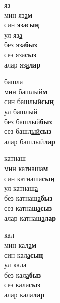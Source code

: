 \begin{multicols}{4}
\begin{enumerate}
\begin{minipage}{\linewidth}
    \item
    яз\\
    мин яз\underline{а}\textbf{м}\\
    син яз\underline{а}\textbf{сың}\\
    ул яз\underline{а}\\
    без яз\underline{а}\textbf{быз}\\
    сез яз\underline{а}\textbf{сыз}\\
    алар яз\underline{а}\textbf{лар}\\
\end{minipage}

\begin{minipage}{\linewidth}
    \item
    башла\\
    мин башл\underline{ый}\textbf{м}\\
    син башл\underline{ый}\textbf{сың}\\
    ул башл\underline{ый}\\
    без башл\underline{ый}\textbf{быз}\\
    сез башл\underline{ый}\textbf{сыз}\\
    алар башл\underline{ый}\textbf{лар}\\
\end{minipage}

\begin{minipage}{\linewidth}
    \item
    катнаш\\
    мин катнаш\underline{а}\textbf{м}\\
    син катнаш\underline{а}\textbf{сың}\\
    ул катнаш\underline{а}\\
    без катнаш\underline{а}\textbf{быз}\\
    сез катнаш\underline{а}\textbf{сыз}\\
    алар катнаш\underline{а}\textbf{лар}\\
\end{minipage}

\begin{minipage}{\linewidth}
    \item
    кал\\
    мин кал\underline{а}\textbf{м}\\
    син кал\underline{а}\textbf{сың}\\
    ул кал\underline{а}\\
    без кал\underline{а}\textbf{быз}\\
    сез кал\underline{а}\textbf{сыз}\\
    алар кал\underline{а}\textbf{лар}\\
\end{minipage}


\end{enumerate}
\end{multicols}
